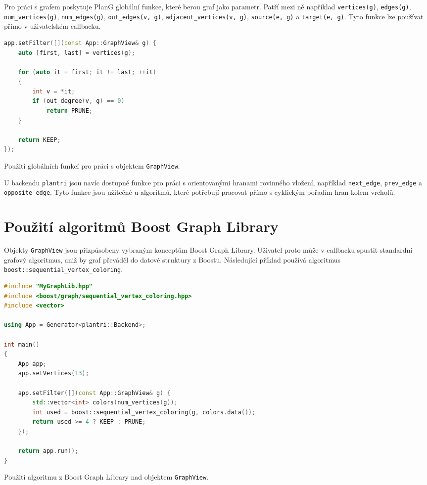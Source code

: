 Pro práci s grafem poskytuje PlanG globální funkce, které berou graf jako
parametr. Patří mezi ně například \texttt{vertices(g)}, \texttt{edges(g)},
\texttt{num\_vertices(g)}, \texttt{num\_edges(g)}, \texttt{out\_edges(v, g)},
\texttt{adjacent\_vertices(v, g)}, \texttt{source(e, g)} a
\texttt{target(e, g)}. Tyto funkce lze používat přímo v uživatelském callbacku.

\begin{listing}
\begin{lstlisting}[language=C++]
app.setFilter([](const App::GraphView& g) {
    auto [first, last] = vertices(g);

    for (auto it = first; it != last; ++it)
    {
        int v = *it;
        if (out_degree(v, g) == 0)
            return PRUNE;
    }

    return KEEP;
});
\end{lstlisting}
\caption{Použití globálních funkcí pro práci s objektem \texttt{GraphView}.}
\label{lst:howto-graphview-functions}
\end{listing}

U backendu \texttt{plantri} jsou navíc dostupné funkce pro práci s orientovanými
hranami rovinného vložení, například \texttt{next\_edge},
\texttt{prev\_edge} a \texttt{opposite\_edge}. Tyto funkce jsou užitečné u
algoritmů, které potřebují pracovat přímo s cyklickým pořadím hran kolem
vrcholů.

\section{Použití algoritmů Boost Graph Library}

Objekty \texttt{GraphView} jsou přizpůsobeny vybraným konceptům Boost Graph
Library. Uživatel proto může v callbacku spustit standardní grafový algoritmus,
aniž by graf převáděl do datové struktury z Boostu. Následující příklad používá
algoritmus \texttt{boost::sequential\_vertex\_coloring}.

\begin{listing}
\begin{lstlisting}[language=C++]
#include "MyGraphLib.hpp"
#include <boost/graph/sequential_vertex_coloring.hpp>
#include <vector>

using App = Generator<plantri::Backend>;

int main()
{
    App app;
    app.setVertices(13);

    app.setFilter([](const App::GraphView& g) {
        std::vector<int> colors(num_vertices(g));
        int used = boost::sequential_vertex_coloring(g, colors.data());
        return used >= 4 ? KEEP : PRUNE;
    });

    return app.run();
}
\end{lstlisting}
\caption{Použití algoritmu z Boost Graph Library nad objektem
\texttt{GraphView}.}
\label{lst:howto-boost}
\end{listing}

